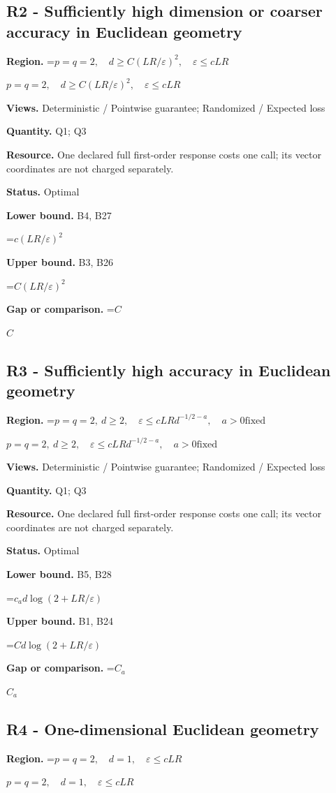\documentclass[10pt,a4paper]{article}
\newcommand{\AtlasMath}[1]{\par\begingroup\centering\setbox0=\hbox{$\displaystyle #1$}\ifdim\wd0>1.4\linewidth\typeout{ATLAS WIDE FORMULA: \the\wd0}\fi\ifdim\wd0>\linewidth\resizebox{\linewidth}{!}{\box0}\else\box0\fi\par\endgroup}
\newcommand{\AtlasInlineMath}[1]{\begingroup\setbox0=\hbox{$#1$}\ifdim\wd0>.4\linewidth\endgroup\AtlasMath{#1}\else\endgroup$#1$\fi}
\begin{document}
\subsection{R2 - Sufficiently high dimension or coarser accuracy in Euclidean geometry}
\textbf{Region.} \AtlasInlineMath{p=q=2,\quad d\ge C(LR/\varepsilon)^2,\quad\varepsilon\le cLR}

\textbf{Views.} Deterministic / Pointwise guarantee; Randomized / Expected loss

\textbf{Quantity.} Q1; Q3

\textbf{Resource.} One declared full first-order response costs one call; its vector coordinates are not charged separately.

\textbf{Status.} Optimal

\textbf{Lower bound.} B4, B27

\AtlasMath{c(LR/\varepsilon)^2}
\textbf{Upper bound.} B3, B26

\AtlasMath{C(LR/\varepsilon)^2}
\textbf{Gap or comparison.} \AtlasInlineMath{C}

\subsection{R3 - Sufficiently high accuracy in Euclidean geometry}
\textbf{Region.} \AtlasInlineMath{p=q=2,\ d\ge2,\quad\varepsilon\le cLRd^{-1/2-a},\quad a>0\text{fixed}}

\textbf{Views.} Deterministic / Pointwise guarantee; Randomized / Expected loss

\textbf{Quantity.} Q1; Q3

\textbf{Resource.} One declared full first-order response costs one call; its vector coordinates are not charged separately.

\textbf{Status.} Optimal

\textbf{Lower bound.} B5, B28

\AtlasMath{c_a d\log(2+LR/\varepsilon)}
\textbf{Upper bound.} B1, B24

\AtlasMath{C d\log(2+LR/\varepsilon)}
\textbf{Gap or comparison.} \AtlasInlineMath{C_a}

\subsection{R4 - One-dimensional Euclidean geometry}
\textbf{Region.} \AtlasInlineMath{p=q=2,\quad d=1,\quad\varepsilon\le cLR}
\end{document}
